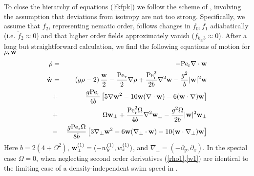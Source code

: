 \documentclass[aps,twocolumn,showlabels,showrefs,amsmath,amssymb,pre,superscriptaddress, floatfix, colors]{revtex4}
\newcommand{\1}{\begin{equation}}
\newcommand{\2}{\end{equation}}
\newcommand{\ea}{\begin{eqnarray}}
\newcommand{\ee}{\end{eqnarray}}
\newcommand{\4}[2]{{\frac{#1}{#2}}}
\begin{document}
To close the hierarchy of equations (\ref{fkfpk}) we follow the scheme of \cite{Bertin2009sm}, involving the assumption that 
deviations from isotropy are not too strong. Specifically, we assume that $f_2$, representing nematic order, follows changes in $f_0,f_1$ adiabatically (i.e. $\dot f_2\approx 0$) and that 
higher order fields approximately vanish ($f_{k_\geq 3} \approx 0$). 
After a long but straightforward calculation, we find the following equations of motion for $\rho, {\bf w}$
\ea
\dot \rho &=& -{\rm Pe}_{\rm r} \nabla \cdot {\bf w} \label{rho1}\\
\dot {\bf w}& =& \left(g \rho-2\right)\4{{\bf w}}{2} - \4{{\rm Pe}_{\rm r}}{2}\nabla \rho + \4{{\rm Pe}^2_{\rm r}}{2 b} \nabla^2 {\bf w} - \4{g^2}{b}|{\bf w}|^2{\bf w}  \label{w1}\\
&+& \4{g {\rm Pe}_{\rm r}}{4 b}\left[5\nabla {\bf w}^2 - 10{\bf w}(\nabla \cdot {\bf w}) -6 ({\bf w}\cdot \nabla){\bf w}\right] \nonumber \\
&+&\Omega {\bf w}_\perp  +\4{{\rm Pe}_{\rm r}^2 \Omega}{4b}\nabla^2 {\bf w}_\perp - \4{g^2 \Omega}{2 b}|{\bf w}|^2 {\bf w}_\perp \nonumber \\ 
&-& \4{g {\rm Pe}_{\rm r} \Omega}{8 b}\left[3\nabla_\perp {\bf w}^2 - 6{\bf w} (\nabla_\perp \cdot {\bf w}) - 10({\bf w} \cdot \nabla_\perp) {\bf w} \right] \nonumber 
\ee
Here $b=2(4+\Omega^2)$, ${\bf w}^{(1)}_\perp=(-w_y^{(1)},w_x^{(1)})$, and $\nabla_\perp=(-\partial_y,\partial_x)$.
In the special case $\Omega=0$, when neglecting second order derivatives (\ref{rho1},\ref{w1}) are identical to the limiting case of a density-independent swim speed in \cite{Farrell2012sm}.
\end{document}

